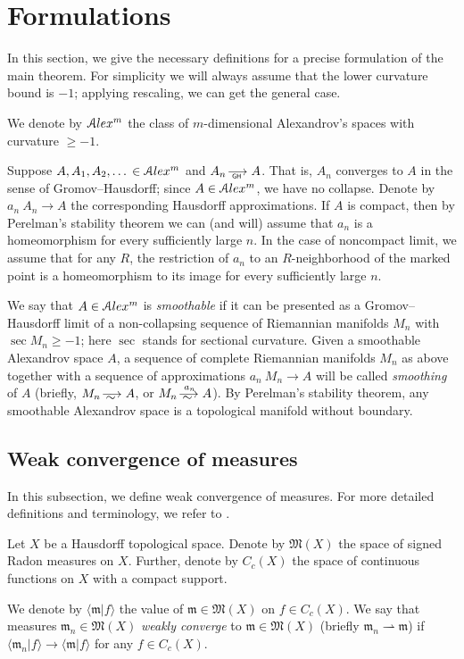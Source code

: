 \section{Formulations}

In this section, we give the necessary definitions for a precise formulation of the main theorem.
For simplicity  we will always assume that the lower
curvature bound is  $-1$;
applying rescaling, we can get the general case.

We denote by
$\mathcal{A}lex^m$ the class of $m$-dimensional Alexandrov's spaces
with curvature $\ge -1$.

Suppose $A,A_1,A_2,\dots{} \in \mathcal{A}lex^m$ and $A_n\GHto A$.
That is, $A_n$ converges to 
$A$ in the sense of Gromov--Hausdorff;
since $A\in \mathcal{A}lex^m$, we have no collapse.
Denote by $a_n\:A_n\to A$ the corresponding Hausdorff approximations.
If $A$ is compact, then by Perelman's stability theorem \cite{PerStab,KapStab} we can (and will) assume that $a_n$ is a homeomorphism for every sufficiently large $n$.
In the case of noncompact limit, we assume that for any $R$, the restriction of $a_n$ to an $R$-neighborhood of the marked point is a homeomorphism to its image for every sufficiently large $n$.

We say that $A\in \mathcal{A}lex^m$ is \emph{smoothable}
if it can be presented as a Gromov--Hausdorff limit of a non-collapsing sequence of Riemannian manifolds $M_n$ with $\sec M_n\ge-1$; here $\sec$ stands for sectional curvature.
Given a smoothable Alexandrov space $A$,
a sequence of complete Riemannian manifolds $M_n$ as above together with a sequence of approximations $a_n\:M_n\to A$
will be called \emph{smoothing} of $A$
(briefly, $M_n\smooths{} A$, or $M_n\smooths{a_n} A$).
By Perelman's stability theorem, any smoothable Alexandrov space is a topological manifold without boundary.

\subsection{Weak convergence of measures}

In this subsection, we define weak convergence of measures.
For more detailed definitions and terminology, we refer to
\cite{GMS}.

Let $X$ be a Hausdorff topological space.
Denote by $\mathfrak M(X)$ the space of signed Radon measures on $X$.
Further, denote by $C_c(X)$  the space of continuous functions on $X$
with a compact support. 

We  denote by $\langle \mathfrak m|f\rangle $ the value of $\mathfrak m\in\mathfrak M(X)$ on $f\in C_c(X)$.
We say that measures $\mathfrak m_n\in \mathfrak M(X)$ \emph{weakly converge} to $\mathfrak m\in \mathfrak M(X)$ (briefly
$\mathfrak m_n\rightharpoonup \mathfrak m$) if $\langle \mathfrak m_n|f\rangle \to \langle \mathfrak m|f\rangle $ for any $f\in C_c(X)$.

